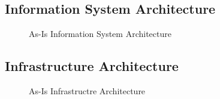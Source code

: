 \subsection{Information System Architecture}
\begin{center}
	\begin{figure}[H]
		\centering
		\setlength\fboxsep{7pt}
		\setlength\fboxrule{0.5pt}
		\caption{As-Is Information System Architecture}
		\label{fig:map_information_as_is}
	\end{figure}
\end{center}
%
\subsection{Infrastructure Architecture}
\begin{center}
	\begin{figure}[H]
		\centering
		\setlength\fboxsep{7pt}
		\setlength\fboxrule{0.5pt}
		\caption{As-Is Infrastructre Architecture}
		\label{fig:map_information_as_is}
	\end{figure}
\end{center}

